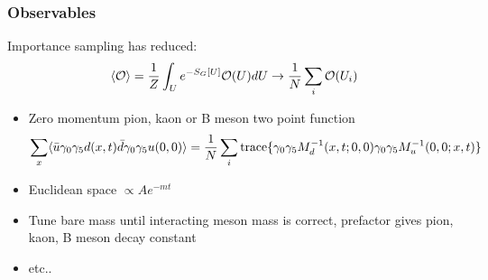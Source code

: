 \documentclass[pdf,ps,8pt]{beamer}
\begin{document}
\begin{frame}[fragile]\small\frametitle{Observables}

Importance sampling has reduced:
$$
\langle {\cal O} \rangle = \frac{1}{Z} \int_U e^{-S_G[U]} {\cal O}(U) dU  \to \frac{1}{N} \sum\limits_i {\cal O}(U_i) 
$$
\begin{itemize}
\item Zero momentum pion, kaon or B meson two point function
  $$
  \sum\limits_x \langle \bar u \gamma_0 \gamma_5 d (x,t) \bar d \gamma_0 \gamma_5 u (0,0) \rangle
    = \frac{1}{N}\sum_i  {\rm trace}  \{ \gamma_0 \gamma_5 M^{-1}_d(x,t;0,0)\gamma_0 \gamma_5 M^{-1}_u(0,0;x,t) \}
    $$
\item Euclidean space $\propto A e^{- m t} $
\item Tune bare mass until interacting meson mass is correct, prefactor gives pion, kaon, B meson decay constant
\item etc.. 
\end{itemize}
  
\end{frame}
\end{document}
